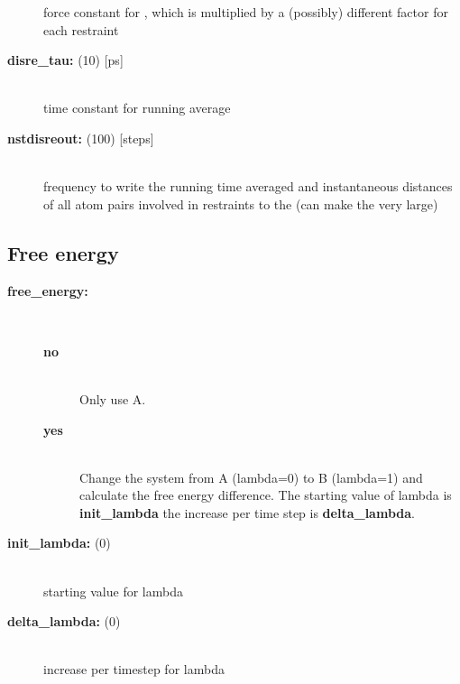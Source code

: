 \begin{description}
force constant for , which is multiplied by a
(possibly) different factor for each restraint
\item[{\bf disre\_tau: }(10) {[ps]}]\mbox{}\\
time constant for  running average
\item[{\bf nstdisreout: }(100) {[steps]}]\mbox{}\\
frequency to write the running time averaged and instantaneous distances
of all atom pairs involved in restraints to the 
(can make the  very large)
\end{description}

\subsection{Free energy}
\begin{description}
\item[{\bf free\_energy:}]\mbox{}\\
\vspace{-2ex}\begin{description}
\item[{\bf no}]\mbox{}\\
Only use  A. 
\item[{\bf yes}]\mbox{}\\
Change the system from  A (lambda=0) to  B (lambda=1)
and calculate the free energy difference.
The starting value of lambda is {\bf init\_lambda} the increase
per time step is {\bf delta\_lambda}.
\end{description}
\item[{\bf init\_lambda: }(0)]\mbox{}\\
starting value for lambda
\item[{\bf delta\_lambda: }(0)]\mbox{}\\
increase per timestep for lambda
\end{description}

